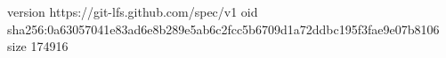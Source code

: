 version https://git-lfs.github.com/spec/v1
oid sha256:0a63057041e83ad6e8b289e5ab6c2fcc5b6709d1a72ddbc195f3fae9e07b8106
size 174916
